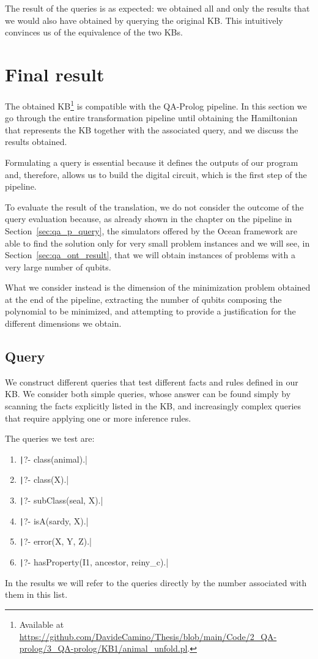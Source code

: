 The result of the queries is as expected: we obtained all and only the results that we would also have obtained by querying the original KB. This intuitively convinces us of the equivalence of the two KBs.

\section{Final result}
The obtained KB\footnote{Available at \url{https://github.com/DavideCamino/Thesis/blob/main/Code/2_QA-prolog/3_QA-prolog/KB1/animal_unfold.pl}.} is compatible with the QA-Prolog pipeline. In this section we go through the entire transformation pipeline until obtaining the Hamiltonian that represents the KB together with the associated query, and we discuss the results obtained.

Formulating a query is essential because it defines the outputs of our program and, therefore, allows us to build the digital circuit, which is the first step of the pipeline.

To evaluate the result of the translation, we do not consider the outcome of the query evaluation because, as already shown in the chapter on the pipeline in Section~\ref{sec:qa_p_query}, the simulators offered by the Ocean framework are able to find the solution only for very small problem instances and we will see, in Section~\ref{sec:qa_ont_result}, that we will obtain instances of problems with a very large number of qubits. 

What we consider instead is the dimension of the minimization problem obtained at the end of the pipeline, extracting the number of qubits composing the polynomial to be minimized, and attempting to provide a justification for the different dimensions we obtain.

\subsection{Query}
We construct different queries that test different facts and rules defined in our KB. We consider both simple queries, whose answer can be found simply by scanning the facts explicitly listed in the KB, and increasingly complex queries that require applying one or more inference rules.

The queries we test are:
\begin{enumerate}
	\item \texttt|?- class(animal).|
	\item \texttt|?- class(X).|
	\item \texttt|?- subClass(seal, X).|
	\item \texttt|?- isA(sardy, X).|
	\item \texttt|?- error(X, Y, Z).|	
	\item \texttt|?- hasProperty(I1, ancestor, reiny_c).|
\end{enumerate}
In the results we will refer to the queries directly by the number associated with them in this list.

